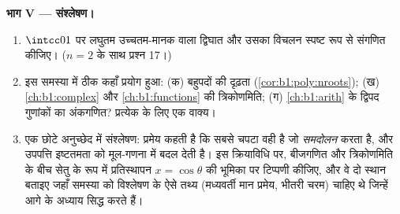 \begin{problem}
\medskip \noindent\textbf{भाग V --- संश्लेषण।}
\begin{enumerate}[resume]
  \item $\intcc01$ पर लघुतम उच्चतम-मानक वाला  द्विघात और उसका विचलन
  स्पष्ट रूप से संगणित कीजिए। ($n = 2$ के साथ प्रश्न 17।)
  \item इस समस्या में ठीक कहाँ प्रयोग हुआ: (क) बहुपदों की दृढ़ता
  (\cref{cor:b1:poly:nroots}); (ख) \cref{ch:b1:complex} और
  \cref{ch:b1:functions} की त्रिकोणमिति; (ग) \cref{ch:b1:arith} के द्विपद
  गुणांकों का अंकगणित? प्रत्येक के लिए एक वाक्य।
  \item एक छोटे अनुच्छेद में संश्लेषण: प्रमेय कहती है कि सबसे चपटा  वही है जो \emph{समदोलन} करता है, और उपपत्ति इष्टतमता को मूल-गणना में
  बदल देती है। इस क्रियाविधि पर, बीजगणित और त्रिकोणमिति के बीच सेतु के रूप
  में प्रतिस्थापन $x = \cos\theta$ की भूमिका पर टिप्पणी कीजिए, और वे दो
  स्थान बताइए जहाँ समस्या को विश्लेषण के ऐसे तथ्य (मध्यवर्ती मान प्रमेय,
  भीतरी चरम) चाहिए थे जिन्हें आगे के अध्याय सिद्ध करते हैं।
\end{enumerate}
\end{problem}
